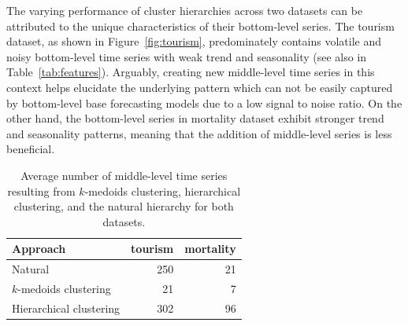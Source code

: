 \documentclass[a4paper,review,12pt,authoryear]{elsarticle}
\begin{document}
The varying performance of cluster hierarchies across two datasets can be attributed to the unique characteristics of their bottom-level series.
The tourism dataset, as shown in Figure~\ref{fig:tourism}, predominately contains volatile and noisy bottom-level time series with weak trend and seasonality (see also in  Table~\ref{tab:features}). Arguably, creating new middle-level time series in this context helps elucidate the underlying pattern which can not be easily captured by bottom-level base forecasting models due to a low signal to noise ratio. 
On the other hand, the bottom-level series in mortality dataset exhibit stronger trend and seasonality patterns, meaning that the addition of middle-level series is less beneficial.\\

\begin{table}[h!]
    \centering
    \caption{\label{tab:P3_number_series}Average number of middle-level time series resulting from $k$-medoids clustering, hierarchical clustering, and the natural hierarchy for both datasets.}
    \begin{tabular}{lrr}
    \toprule
        Approach &  tourism& mortality \\ \midrule
     Natural &250  & 21 \\ 
        $k$-medoids clustering &  21&  7\\ 
        Hierarchical clustering &302   & 96\\ \bottomrule
    \end{tabular}
\end{table}
\end{document}
